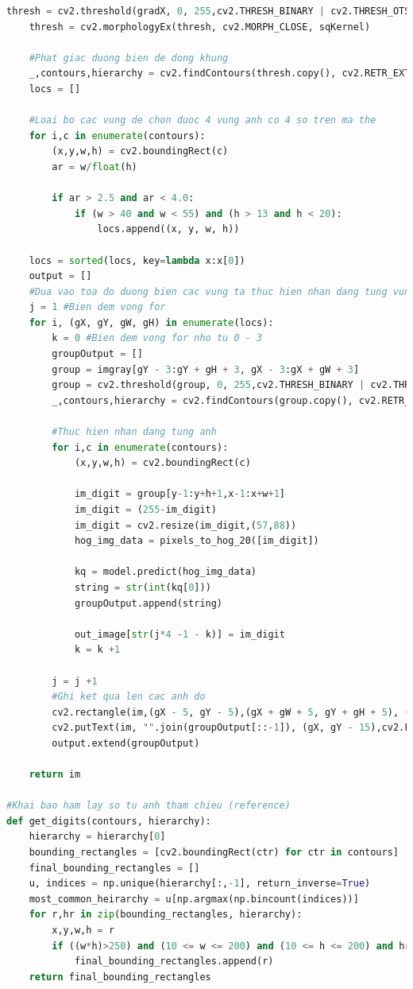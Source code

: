 \begin{lstlisting}[language=Python, caption=Recognition Mastercard]
    thresh = cv2.threshold(gradX, 0, 255,cv2.THRESH_BINARY | cv2.THRESH_OTSU)[1]
    thresh = cv2.morphologyEx(thresh, cv2.MORPH_CLOSE, sqKernel)

    #Phat giac duong bien de dong khung 
    _,contours,hierarchy = cv2.findContours(thresh.copy(), cv2.RETR_EXTERNAL, cv2.CHAIN_APPROX_SIMPLE)
    locs = []

    #Loai bo cac vung de chon duoc 4 vung anh co 4 so tren ma the
    for i,c in enumerate(contours):
        (x,y,w,h) = cv2.boundingRect(c)
        ar = w/float(h)

        if ar > 2.5 and ar < 4.0:
            if (w > 40 and w < 55) and (h > 13 and h < 20):
                locs.append((x, y, w, h))

    locs = sorted(locs, key=lambda x:x[0])
    output = [] 
    #Dua vao toa do duong bien cac vung ta thuc hien nhan dang tung vung
    j = 1 #Bien dem vong for
    for i, (gX, gY, gW, gH) in enumerate(locs):
        k = 0 #Bien dem vong for nho tu 0 - 3
        groupOutput = [] 
        group = imgray[gY - 3:gY + gH + 3, gX - 3:gX + gW + 3]
        group = cv2.threshold(group, 0, 255,cv2.THRESH_BINARY | cv2.THRESH_OTSU)[1]
        _,contours,hierarchy = cv2.findContours(group.copy(), cv2.RETR_EXTERNAL,cv2.CHAIN_APPROX_SIMPLE)

        #Thuc hien nhan dang tung anh
        for i,c in enumerate(contours):
            (x,y,w,h) = cv2.boundingRect(c)

            im_digit = group[y-1:y+h+1,x-1:x+w+1]
            im_digit = (255-im_digit)
            im_digit = cv2.resize(im_digit,(57,88))
            hog_img_data = pixels_to_hog_20([im_digit])
            
            kq = model.predict(hog_img_data)
            string = str(int(kq[0]))
            groupOutput.append(string)

            out_image[str(j*4 -1 - k)] = im_digit
            k = k +1
            
        j = j +1
        #Ghi ket qua len cac anh do 
        cv2.rectangle(im,(gX - 5, gY - 5),(gX + gW + 5, gY + gH + 5), (255, 0, 255), 2)
        cv2.putText(im, "".join(groupOutput[::-1]), (gX, gY - 15),cv2.FONT_HERSHEY_SIMPLEX, 0.65, (0, 0, 255), 2)
        output.extend(groupOutput)
       
    return im      

#Khai bao ham lay so tu anh tham chieu (reference)
def get_digits(contours, hierarchy):
    hierarchy = hierarchy[0]
    bounding_rectangles = [cv2.boundingRect(ctr) for ctr in contours]   
    final_bounding_rectangles = []
    u, indices = np.unique(hierarchy[:,-1], return_inverse=True)
    most_common_heirarchy = u[np.argmax(np.bincount(indices))]
    for r,hr in zip(bounding_rectangles, hierarchy):
        x,y,w,h = r
        if ((w*h)>250) and (10 <= w <= 200) and (10 <= h <= 200) and hr[3] == most_common_heirarchy: 
            final_bounding_rectangles.append(r)    
    return final_bounding_rectangles


\end{lstlisting}
